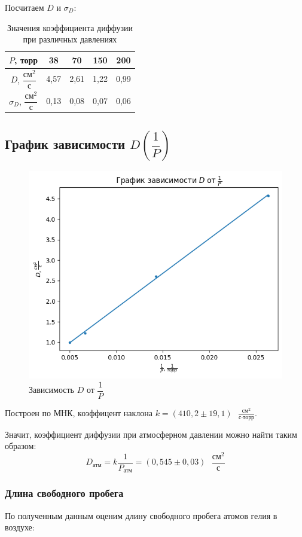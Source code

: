 \documentclass[
a4paper, %
12pt, %
]{article}
\begin{document}
	Посчитаем $D\text{ и }\sigma_D$:
	
	\begin{table}[h!]
		\centering
		\begin{tabular}{|c||c|c|c|c|}
			\hline
			$ P $, торр & 38 & 70 & 150 & 200 \\
			\hline
			$ D $, $\dfrac{\text{см}^2}{\text{с}}$ & 4,57 & 2,61 & 1,22 & 0,99 \\
			\hline
			$ \sigma_D $, $\dfrac{\text{см}^2}{\text{с}}$ & 0,13 & 0,08 & 0,07 & 0,06\\
			\hline
		\end{tabular}
		\caption{Значения коэффициента диффузии при различных давлениях}
		\label{tab:D}
	\end{table}
	
	\subsection{График зависимости $D(\dfrac{1}{P})$}
	
	\begin{figure}[h!]
		\centering
		\includegraphics[width=0.5\linewidth]{img/2ndgraph.png}
		\caption{Зависимость $ D $ от $ \dfrac{1}{P}$}
		\label{fig:2nd_graph}
	\end{figure}
	
	Построен по МНК, коэффицент наклона $k = (410,2\pm19,1)\text{ } \frac{\text{см}^2}{\text{с}\cdot\text{торр}}$. 
	
	Значит, коэффициент диффузии при атмосферном давлении можно найти таким образом:\[D_\text{атм} = k\dfrac{1}{P_\text{атм}} = (0,545\pm0,03)\text{ } \frac{\text{см}^2}{\text{с}}\]
	
	\subsubsection{Длина свободного пробега}
	По полученным данным оценим длину свободного пробега атомов гелия в воздухе:
	
\end{document}
